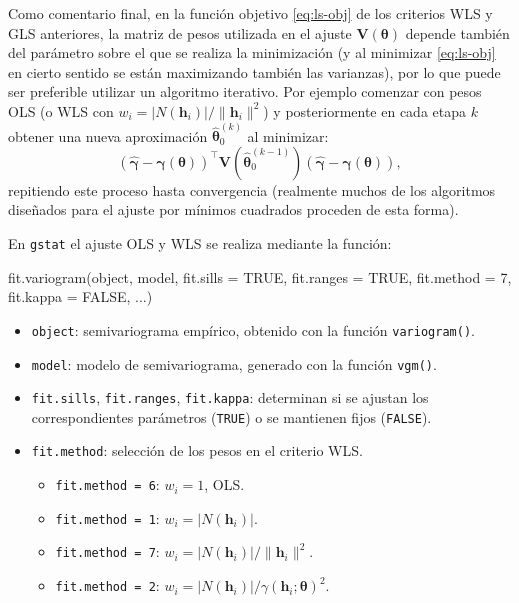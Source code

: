 \documentclass[
  spanish,
]{book}
\newenvironment{Shaded}{\begin{snugshade}}{\end{snugshade}}
\newcommand{\AttributeTok}[1]{\textcolor[rgb]{0.77,0.63,0.00}{#1}}
\newcommand{\ConstantTok}[1]{\textcolor[rgb]{0.00,0.00,0.00}{#1}}
\newcommand{\DecValTok}[1]{\textcolor[rgb]{0.00,0.00,0.81}{#1}}
\newcommand{\FunctionTok}[1]{\textcolor[rgb]{0.00,0.00,0.00}{#1}}
\newcommand{\NormalTok}[1]{#1}
\providecommand{\tightlist}{%
  \setlength{\itemsep}{0pt}\setlength{\parskip}{0pt}}
\theoremstyle{break}
\theoremstyle{definition}
\theoremstyle{definition}
\theoremstyle{definition}
\theoremstyle{definition}
\theoremstyle{remark}
\begin{document}
Como comentario final, en la función objetivo \eqref{eq:ls-obj} de los criterios WLS y GLS anteriores, la matriz de pesos utilizada en el ajuste \(\mathbf{V}(\boldsymbol{\theta})\) depende también del parámetro sobre el que se realiza la minimización (y al minimizar \eqref{eq:ls-obj} en cierto sentido se están maximizando también las varianzas), por lo que puede ser preferible utilizar un algoritmo iterativo.
Por ejemplo comenzar con pesos OLS (o WLS con \(w_{i} = \left| N(\mathbf{h}_{i})\right| / \| \mathbf{h}_{i} \|^2\)) y posteriormente en cada etapa \(k\) obtener una nueva aproximación \(\hat{\boldsymbol{\theta}}_0^{(k)}\) al minimizar:
\[\left( \hat{\boldsymbol{\gamma}} - \boldsymbol{\gamma}(\boldsymbol{\theta})\right)^{\top } \mathbf{V}(\hat{\boldsymbol{\theta}}_0^{(k-1)})\left( \hat{\boldsymbol{\gamma}} - \boldsymbol{\gamma}(\boldsymbol{\theta})\right),\]
repitiendo este proceso hasta convergencia (realmente muchos de los algoritmos diseñados para el ajuste por mínimos cuadrados proceden de esta forma).

En \texttt{gstat} el ajuste OLS y WLS se realiza mediante la función:

\begin{Shaded}
\begin{Highlighting}[]
\FunctionTok{fit.variogram}\NormalTok{(object, model, }\AttributeTok{fit.sills =} \ConstantTok{TRUE}\NormalTok{, }\AttributeTok{fit.ranges =} \ConstantTok{TRUE}\NormalTok{,}
              \AttributeTok{fit.method =} \DecValTok{7}\NormalTok{, }\AttributeTok{fit.kappa =} \ConstantTok{FALSE}\NormalTok{, ...)}
\end{Highlighting}
\end{Shaded}

\begin{itemize}
\item
  \texttt{object}: semivariograma empírico, obtenido con la función \texttt{variogram()}.
\item
  \texttt{model}: modelo de semivariograma, generado con la función \texttt{vgm()}.
\item
  \texttt{fit.sills}, \texttt{fit.ranges}, \texttt{fit.kappa}: determinan si se ajustan los correspondientes parámetros (\texttt{TRUE}) o se mantienen fijos (\texttt{FALSE}).
\item
  \texttt{fit.method}: selección de los pesos en el criterio WLS.

  \begin{itemize}
  \tightlist
  \item
    \texttt{fit.method\ =\ 6}: \(w_{i} = 1\), OLS.
  \item
    \texttt{fit.method\ =\ 1}: \(w_{i} = \left| N(\mathbf{h}_{i})\right|\).
  \item
    \texttt{fit.method\ =\ 7}: \(w_{i} = \left| N(\mathbf{h}_{i})\right| / \| \mathbf{h}_{i} \|^2\).
  \item
    \texttt{fit.method\ =\ 2}: \(w_{i} = \left| N(\mathbf{h}_{i})\right| /\gamma(\mathbf{h}_{i} ;\boldsymbol{\theta})^2\).
  \end{itemize}
\end{itemize}
\end{document}
